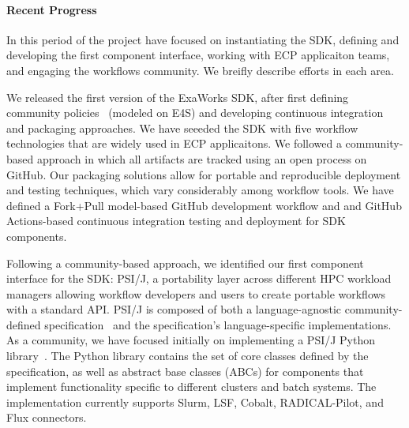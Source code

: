 \paragraph{Recent Progress}



In this period of the project have focused on instantiating the SDK, defining and developing
the first component interface, working with ECP applicaiton teams, and engaging
the workflows community. We breifly describe efforts in each area. 

We released the first version of the ExaWorks SDK, after first defining
community policies~\cite{sdk-policies} (modeled on E4S) and developing continuous integration and packaging
approaches. We have seeeded the SDK with five workflow technologies 
that are widely used in ECP applicaitons. We followed a community-based
approach in which all artifacts are tracked using an open process on GitHub.
Our packaging solutions allow for portable and reproducible deployment and 
testing techniques, which vary considerably among workflow tools.  
We have defined a Fork+Pull model-based GitHub development workflow and and 
GitHub Actions-based continuous integration testing and deployment for SDK components.

Following a community-based approach, we identified our first component interface for
the SDK: PSI/J, a portability layer across different HPC workload managers 
allowing workflow developers and users to create portable workflows with a standard API. 
PSI/J is composed of both a language-agnostic community-defined specification~\cite{jpsi-spec} and the 
specification's language-specific implementations. 
As a community, we have focused initially on implementing a PSI/J Python 
library~\cite{jpsi-python}.   The Python library contains the set of
core classes defined by the specification, as well as abstract base classes (ABCs) for components 
that implement functionality specific to different clusters and batch systems.
The implementation currently supports Slurm, LSF, Cobalt, RADICAL-Pilot, and Flux connectors. 

